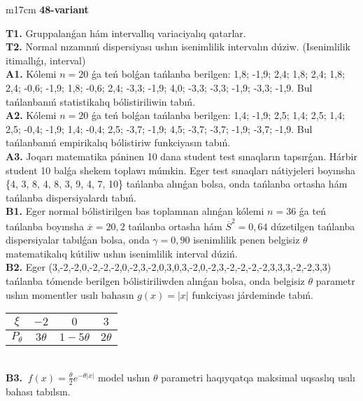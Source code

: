 \documentclass{article}
\begin{document}
\vspace{1cm}


\begin{tabular}{m{17cm}}
\textbf{48-variant}
\newline

\textbf{T1.} 
Gruppalanǵan hám intervallıq variaciyalıq qatarlar.
 \\
\textbf{T2.} 
Normal nızamnıń dispersiyası ushın isenimlilik intervalın dúziw. (Isenimlilik itimallıǵı, interval)
 \\
\textbf{A1.} 
Kólemi \(n = 20\) ǵa teń bolǵan tańlanba berilgen: 1,8; -1,9; 2,4; 1,8; 2,4; 1,8; 2,4; -0,6; -1,9; 1,8; -0,6; 2,4; -3,3; -1,9; 4,0; -3,3; -3,3; -1,9; -3,3; -1,9. Bul tańlanbanıń statistikalıq bólistiriliwin tabıń.
 \\
\textbf{A2.} 
Kólemi \(n = 20\) ǵa teń bolǵan tańlanba berilgen: 1,4; -1,9; 2,5; 1,4; 2,5; 1,4; 2,5; -0,4; -1,9; 1,4; -0,4; 2,5; -3,7; -1,9; 4,5; -3,7; -3,7; -1,9; -3,7; -1,9. Bul tańlanbanıń empirikalıq bólistiriw funkciyasın tabıń.
 \\
\textbf{A3.} 
Joqarı matematika páninen 10 dana student test sınaqların tapsırǵan. Hárbir student 10 balǵa shekem toplawı múmkin. Eger test sınaqları nátiyjeleri boyınsha \{4, 3, 8, 4, 8, 3, 9, 4, 7, 10\} tańlanba alınǵan bolsa, onda tańlanba ortasha hám tańlanba dispersiyalardı tabıń.
 \\
\textbf{B1.} 
Eger normal bólistirilgen bas toplamnan alınǵan kólemi \(n = 36\) ǵa teń tańlanba boyınsha \(\overline{x} = 20,2\) tańlanba ortasha hám \({\overline{S}}^{2} = 0,64\) dúzetilgen tańlanba dispersiyalar tabılǵan bolsa, onda \(\gamma = 0,90\) isenimlilik penen belgisiz \(\theta\) matematikalıq kútiliw ushın isenimlilik interval dúziń.
 \\
\textbf{B2.} 
Eger (3,-2,-2,0,-2,-2,-2,0,-2,3,-2,0,3,0,3,-2,0,-2,3,-2,-2,-2,-2,3,3,3,-2,-2,3,3) tańlanba tómende berilgen bólistiriliwden alınǵan bolsa, onda belgisiz \(\theta\) parametr ushın momentler usılı bahasın \(g(x) = |x|\) funkciyası járdeminde tabıń.
\begin{tabular}{|c|c|c|c|}
  \hline
$\xi$ &
$- 2$ &
$0$ &
$3$ \\
\hline
\(P_{\theta}\) & \(3\theta\) & \(1 - 5\theta\) & \(2\theta\) \\
\hline
\end{tabular}
 \\
\textbf{B3.} 
\(\ f(x) = \frac{\theta}{2}e^{- \theta|x|}\) model ushın \(\theta\) parametri haqıyqatqa maksimal uqsaslıq usılı bahası tabılsın.
 \\

\end{tabular}
\end{document}
